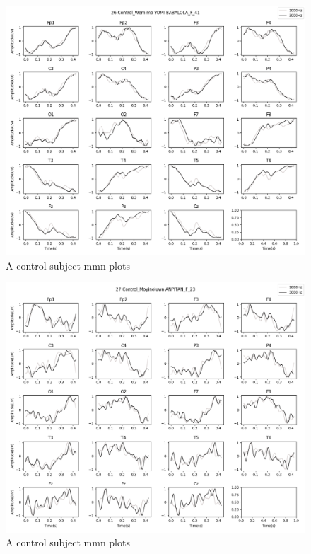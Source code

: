 \documentclass[10pt]{article}
\begin{document}
\begin{figure}[H]
  \includegraphics[width=16cm]{../../../data_analysis_results/MMN/time_series/Control/26.png}
  \caption{A control subject \gls{mmn} plots}
\end{figure}
\begin{figure}[H]
  \includegraphics[width=16cm]{../../../data_analysis_results/MMN/time_series/Control/27.png}
  \caption{A control subject \gls{mmn} plots}
\end{figure}
\end{document}
